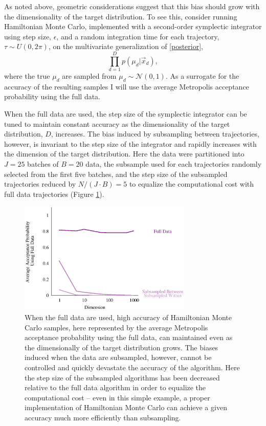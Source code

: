 \documentclass{article}
\begin{document}
As noted above, geometric considerations suggest that this bias should grow with the 
dimensionality of the target distribution.  To see this, consider running Hamiltonian
Monte Carlo, implemented with a second-order symplectic integrator using step size, 
$\epsilon$, and a random integration time for each trajectory, $\tau \sim U \! \left(0, 2 \pi \right)$,
on the multivariate generalization of \eqref{posterior},
%
\begin{equation} \label{multivariate_posterior}
\prod_{d = 1}^{D} p \! \left( \mu_{d} | \vec{x}_{d} \right),
\end{equation}
%
where the true $\mu_{d}$ are sampled from $\mu_{d} \sim \mathcal{N} \! \left( 0, 1 \right)$.
As a surrogate for the accuracy of the resulting samples I will use the average
Metropolis acceptance probability using the full data.

When the full data are used, the step size of the symplectic integrator can be tuned to 
maintain constant accuracy as the dimensionality of the target distribution, $D$, increases.
The bias induced by subsampling between trajectories, however, is invariant to the
step size of the integrator and rapidly increases with the dimension of the target distribution.
Here the data were partitioned into $J = 25$ batches of $B = 20$ data, the subsample
used for each trajectories randomly selected from the first five batches, and the step size 
of the subsampled trajectories reduced by $N / (J \cdot B) = 5$ to equalize the computational
cost with full data trajectories (Figure \ref{fig:multivariate}).

\begin{figure}
\centering
\includegraphics[width=3.25in]{multivariate.eps}
\caption{When the full data are used, high accuracy of Hamiltonian Monte Carlo samples, 
here represented by the average Metropolis acceptance probability using the full data, can 
maintained even as the dimensionally of the target distribution grows.  The biases induced 
when the data are subsampled, however, cannot be controlled and quickly devastate the 
accuracy of the algorithm.  Here the step size of the subsampled algorithms has been decreased
relative to the full data algorithm in order to equalize the computational cost -- even in this
simple example, a proper implementation of Hamiltonian Monte Carlo can achieve a given
accuracy much more efficiently than subsampling.}
\label{fig:multivariate}
\end{figure}
\end{document}
